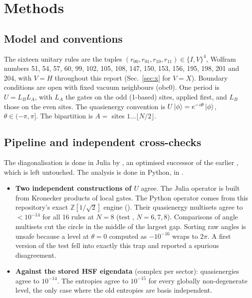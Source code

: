 \section{Methods}
\label{sec:methods}

\subsection{Model and conventions}
The sixteen unitary rules are the tuples $(r_{00},r_{01},r_{10},r_{11})\in\{I,V\}^4$, Wolfram numbers
51, 54, 57, 60, 99, 102, 105, 108, 147, 150, 153, 156, 195, 198, 201 and 204,
with $V=H$ throughout this report (Sec.~\ref{sec:x} for $V=X$). Boundary
conditions are open with fixed vacuum neighbours (obc0). One period is
$U=L_BL_A$, with $L_A$ the gates on the odd (1-based) sites, applied first, and
$L_B$ those on the even sites. The quasienergy convention is
$U\ket{\phi}=e^{-i\theta}\ket{\phi}$, $\theta\in(-\pi,\pi]$. The bipartition is
$A=$ sites $1\ldots\lfloor N/2\rfloor$.

\subsection{Pipeline and independent cross-checks}
The diagonalisation is done in Julia by , an
optimised successor of the earlier , which is left
untouched. The analysis is done in Python, in .
\begin{itemize}
\item \textbf{Two independent constructions of $U$} agree. The Julia operator
  is built from Kronecker products of local gates. The Python operator comes
  from this repository's exact $\mathbb{Z}[1/\sqrt2]$ engine
  (). Their quasienergy multisets agree to $<10^{-14}$ for all
  16 rules at $N=8$ (test , $N=6,7,8$).
  Comparisons of angle multisets cut the circle in the middle of the largest
  gap. Sorting raw angles is unsafe because a level at $\theta=0$ computed as
  $-10^{-16}$ wraps to $2\pi$. A first version of the test fell into exactly
  this trap and reported a spurious disagreement.
\item \textbf{Against the stored HSF eigendata} (complex  per sector):
  quasienergies agree to $10^{-14}$. The entropies agree to $10^{-15}$ for every
  globally non-degenerate level, the only case where the old entropies are
  basis independent.
\end{itemize}

